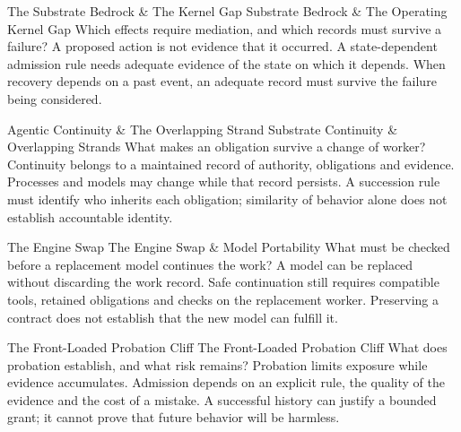 \expandafter\def\csname pdlandmarktitle@01\endcsname{The Substrate Bedrock \& The Kernel Gap}
\expandafter\def\csname pdlandmarkconcept@01\endcsname{Substrate Bedrock \& The Operating Kernel Gap}
\expandafter\def\csname pdlandmarkquestion@01\endcsname{Which effects require mediation, and which records must survive a failure?}
\expandafter\def\csname pdlandmarkquote@01\endcsname{A proposed action is not evidence that it occurred. A state-dependent admission rule needs adequate evidence of the state on which it depends. When recovery depends on a past event, an adequate record must survive the failure being considered.}

\expandafter\def\csname pdlandmarktitle@02\endcsname{Agentic Continuity \& The Overlapping Strand}
\expandafter\def\csname pdlandmarkconcept@02\endcsname{Substrate Continuity \& Overlapping Strands}
\expandafter\def\csname pdlandmarkquestion@02\endcsname{What makes an obligation survive a change of worker?}
\expandafter\def\csname pdlandmarkquote@02\endcsname{Continuity belongs to a maintained record of authority, obligations and evidence. Processes and models may change while that record persists. A succession rule must identify who inherits each obligation; similarity of behavior alone does not establish accountable identity.}

\expandafter\def\csname pdlandmarktitle@03\endcsname{The Engine Swap}
\expandafter\def\csname pdlandmarkconcept@03\endcsname{The Engine Swap \& Model Portability}
\expandafter\def\csname pdlandmarkquestion@03\endcsname{What must be checked before a replacement model continues the work?}
\expandafter\def\csname pdlandmarkquote@03\endcsname{A model can be replaced without discarding the work record. Safe continuation still requires compatible tools, retained obligations and checks on the replacement worker. Preserving a contract does not establish that the new model can fulfill it.}

\expandafter\def\csname pdlandmarktitle@04\endcsname{The Front-Loaded Probation Cliff}
\expandafter\def\csname pdlandmarkconcept@04\endcsname{The Front-Loaded Probation Cliff}
\expandafter\def\csname pdlandmarkquestion@04\endcsname{What does probation establish, and what risk remains?}
\expandafter\def\csname pdlandmarkquote@04\endcsname{Probation limits exposure while evidence accumulates. Admission depends on an explicit rule, the quality of the evidence and the cost of a mistake. A successful history can justify a bounded grant; it cannot prove that future behavior will be harmless.}

